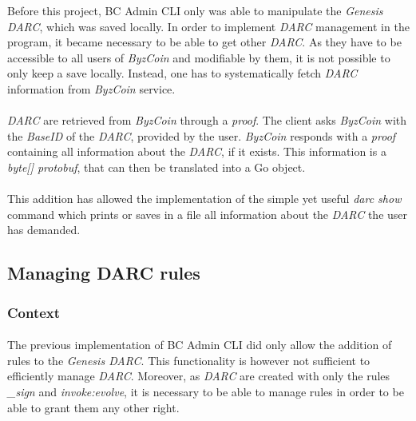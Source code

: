 Before this project, BC Admin CLI only was able to manipulate the \textit{Genesis DARC}, which was saved locally. In order to implement \textit{DARC} management in the program, it became necessary to be able to get other \textit{DARC}. As they have to be accessible to all users of \textit{ByzCoin} and modifiable by them, it is not possible to only keep a save locally. Instead, one has to systematically fetch \textit{DARC} information from \textit{ByzCoin} service.

\paragraph{}

\textit{DARC} are retrieved from \textit{ByzCoin} through a \textit{proof}. The client asks \textit{ByzCoin} with the \textit{BaseID} of the \textit{DARC}, provided by the user. \textit{ByzCoin} responds with a \textit{proof} containing all information about the \textit{DARC}, if it exists. This information is a \textit{byte[] protobuf}, that can then be translated into a Go object.

\paragraph{}

This addition has allowed the implementation of the simple yet useful \textit{darc show} command which prints or saves in a file all information about the \textit{DARC} the user has demanded.

\subsection{Managing DARC rules}

\subsubsection{Context}

\paragraph{}

The previous implementation of BC Admin CLI did only allow the addition of rules to the \textit{Genesis DARC}. This functionality is however not sufficient to efficiently manage \textit{DARC}. Moreover, as \textit{DARC} are created with only the rules \textit{\_sign} and \textit{invoke:evolve}, it is necessary to be able to manage rules in order to be able to grant them any other right.

